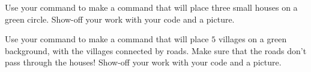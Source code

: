 \documentclass[noauthor,nooutcomes,12pt]{ximera}
\begin{document}
\mynewpage

\begin{problem}
  Use your command  to make a command  that will
  place three small houses on a green circle. Show-off your work with
  your code and a picture.
\end{problem}

\mynewpage

\begin{problem}
  Use your command  to make a command  that
  will place $5$ villages on a green background, with the villages
  connected by roads. Make sure that the roads don't pass through the
  houses! Show-off your work with your code and a picture.
\end{problem}
\end{document}
